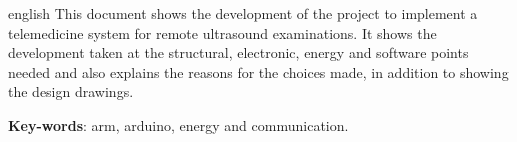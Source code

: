 \begin{resumo}[Abstract]
 \begin{otherlanguage*}{english}
   This document shows the development of the project to implement a telemedicine system for remote ultrasound examinations. It shows the development taken at the structural, electronic, energy and software points needed and also explains the reasons for the choices made, in addition to showing the design drawings.   

   \vspace{\onelineskip}
 
   \noindent 
   \textbf{Key-words}: arm, arduino, energy and communication.
 \end{otherlanguage*}
\end{resumo}
